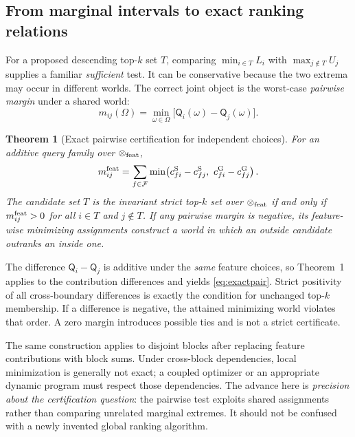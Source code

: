 \documentclass[conference]{IEEEtran}
\newtheorem{theorem}{Theorem}
\newcommand{\OO}{\mathcal{\Omega}}
\newcommand{\F}{\mathcal{F}}
\newcommand{\Q}{\mathsf{Q}}
\newcommand{\Sref}{\mathrm{S}}
\newcommand{\Gref}{\mathrm{G}}
\begin{document}
\subsection{From marginal intervals to exact ranking relations}
For a proposed descending top-$k$ set $T$, comparing $\min_{i\in T}L_i$ with $\max_{j\notin T}U_j$ supplies a familiar \emph{sufficient} test. It can be conservative because the two extrema may occur in different worlds. The correct joint object is the worst-case \emph{pairwise margin} under a shared world:
\begin{equation}
 m_{ij}(\OO)=\min_{\omega\in\OO}\big[\Q_i(\omega)-\Q_j(\omega)\big].
\label{eq:margin}
\end{equation}

\begin{theorem}[Exact pairwise certification for independent choices]
For an additive query family over $\OO_{\rm feat}$,
\begin{equation}
 m_{ij}^{\rm feat}=\sum_{f\in\F}\min\!\left(c_{fi}^{\Sref}-c_{fj}^{\Sref},\ c_{fi}^{\Gref}-c_{fj}^{\Gref}\right).
\label{eq:exactpair}
\end{equation}
The candidate set $T$ is the invariant strict top-$k$ set over $\OO_{\rm feat}$ if and only if $m_{ij}^{\rm feat}>0$ for all $i\in T$ and $j\notin T$. If any pairwise margin is negative, its feature-wise minimizing assignments construct a world in which an outside candidate outranks an inside one.
\end{theorem}
\begin{IEEEproof}
The difference $\Q_i-\Q_j$ is additive under the \emph{same} feature choices, so Theorem~1 applies to the contribution differences and yields \eqref{eq:exactpair}. Strict positivity of all cross-boundary differences is exactly the condition for unchanged top-$k$ membership. If a difference is negative, the attained minimizing world violates that order. A zero margin introduces possible ties and is not a strict certificate.
\end{IEEEproof}

The same construction applies to disjoint blocks after replacing feature contributions with block sums. Under cross-block dependencies, local minimization is generally not exact; a coupled optimizer or an appropriate dynamic program must respect those dependencies. The advance here is \emph{precision about the certification question}: the pairwise test exploits shared assignments rather than comparing unrelated marginal extremes. It should not be confused with a newly invented global ranking algorithm.
\end{document}
